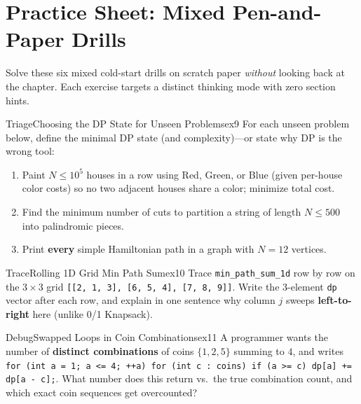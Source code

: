 \documentclass[11pt,a4paper]{article}
\theoremstyle{definition}
\newcounter{exercise}
\begin{document}
\section*{Practice Sheet: Mixed Pen-and-Paper Drills}

\noindent
Solve these six mixed cold-start drills on scratch paper \emph{without} looking back at the chapter. Each exercise targets a distinct thinking mode with zero section hints.

\begin{tryitbox}{Triage}{Choosing the DP State for Unseen Problems}{ex9}
For each unseen problem below, define the minimal DP state (and complexity)---or state why DP is the wrong tool:
\begin{enumerate}
    \item Paint $N \le 10^5$ houses in a row using Red, Green, or Blue (given per-house color costs) so no two adjacent houses share a color; minimize total cost.
    \item Find the minimum number of cuts to partition a string of length $N \le 500$ into palindromic pieces.
    \item Print \textbf{every} simple Hamiltonian path in a graph with $N = 12$ vertices.
\end{enumerate}
\end{tryitbox}

\begin{tryitbox}{Trace}{Rolling 1D Grid Min Path Sum}{ex10}
Trace \texttt{min\_path\_sum\_1d} row by row on the $3 \times 3$ grid \texttt{[[2, 1, 3], [6, 5, 4], [7, 8, 9]]}. Write the 3-element \texttt{dp} vector after each row, and explain in one sentence why column $j$ sweeps \textbf{left-to-right} here (unlike 0/1 Knapsack).
\end{tryitbox}

\begin{tryitbox}{Debug}{Swapped Loops in Coin Combinations}{ex11}
A programmer wants the number of \textbf{distinct combinations} of coins $\{1, 2, 5\}$ summing to $4$, and writes \texttt{for (int a = 1; a <= 4; ++a) for (int c : coins) if (a >= c) dp[a] += dp[a - c];}. What number does this return vs.\ the true combination count, and which exact coin sequences get overcounted?
\end{tryitbox}
\end{document}
